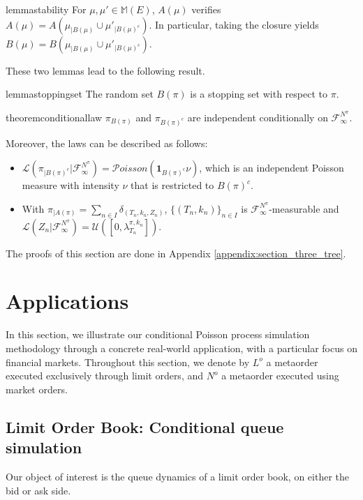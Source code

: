 \documentclass{article} %
\newcommand{\1}{\mathbbm{1}} %
\newcommand{\ind}{\mathbf{1}}
\begin{document}
\begin{restatable}{lemma}{stability}
    \label{lem:stability}
    For $\mu, \mu' \in \mathbb{M}(E)$, $A(\mu)$ verifies $A(\mu) = A(\mu_{|B(\mu)} \cup \mu'_{|B(\mu)^c})$.
    In particular, taking the closure yields $B(\mu) = B(\mu_{|B(\mu)} \cup \mu'_{|B(\mu)^c})$.
\end{restatable}

These two lemmas lead to the following result.

\begin{restatable}{lemma}{stoppingset}
\label{lem:stoppingset}
    The random set $B(\pi)$ is a stopping set with respect to $\pi$.
\end{restatable}

\begin{restatable}{theorem}{conditionallaw}
    \label{thm:conditionallaw}
    $\pi_{B(\pi)}$ and $\pi_{B(\pi)^c}$ are independent conditionally on $\mathcal{F}^{N^\pi}_{\infty}$.

    Moreover, the laws can be described as follows:
    \begin{itemize}
        \item $\mathcal{L}(\pi_{|B(\pi)^c}| \mathcal{F}^{N^\pi}_\infty) = \mathcal{P}oisson(\ind_{B(\pi)^c} \nu)$, which is an independent Poisson measure with intensity $\nu$ that is restricted to $B(\pi)^c$.
        \item With $\pi_{|A(\pi)} = \sum_{n \in I} \delta_{(T_n, k_n, Z_n)}$, $\{(T_n, k_n)\}_{n \in I}$ is $\mathcal{F}^{N^\pi}_\infty$-measurable and $\mathcal{L}(Z_n | \mathcal{F}^{N^\pi}_{\infty}) = \mathcal{U}([0, \lambda^{\pi, k_n}_{T_n}])$.
    \end{itemize}
\end{restatable}

The proofs of this section are done in Appendix \ref{appendix:section_three_tree}.

\section{Applications}
\label{sec:applications}
In this section, we illustrate our conditional Poisson process simulation methodology through a concrete real-world application, with a particular focus on financial markets. Throughout this section, we denote by $L^o$ a metaorder executed exclusively through limit orders, and $N^o$ a metaorder executed using market orders. 
\subsection{Limit Order Book: Conditional queue simulation} \label{subsec:lob_sim}
Our object of interest is the queue dynamics of a limit order book, on either the bid or ask side.
\end{document}
